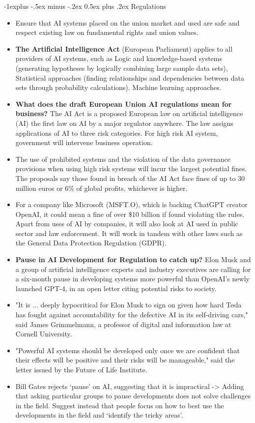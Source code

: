 \documentclass[12pt, landscape]{article}
\makeatletter
\renewcommand{\subsection}{\@startsection{subsection}{2}{0mm}%
                                {-1explus -.5ex minus -.2ex}%
                                {0.5ex plus .2ex}%
                                {\normalfont\normalsize\bfseries}}
\makeatother
\begin{document}
\begin{multicols*}{3}
\subsection{Regulations}
\begin{itemize}
\item Ensure that AI systems placed on the union market and used are safe and respect existing law on fundamental rights and union values.
\item \textbf{The Artificial Intelligence Act} (European Parliament) applies to all providers of AI systems, such as 
Logic and knowledge-based systems (generating hypotheses by logically combining large sample data sets),
Statistical approaches (finding relationships and dependencies between data sets through probability calculations).
Machine learning approaches.
\item \textbf{What does the draft European Union AI regulations mean for business?} The AI Act is a proposed European law on artificial intelligence (AI) the first law on AI by a major regulator anywhere. The law assigns applications of AI to three risk categories. For high risk AI system, government will intervene business operation.
\item The use of prohibited systems and the violation of the data governance provisions when using high risk systems will incur the largest potential fines. The proposals say those found in breach of the AI Act face fines of up to 30 million euros or 6\% of global profits, whichever is higher.
\item For a company like Microsoft (MSFT.O), which is backing ChatGPT creator OpenAI, it could mean a fine of over \$10 billion if found violating the rules. Apart from uses of AI by companies, it will also look at AI used in public sector and law enforcement. It will work in tandem with other laws such as the General Data Protection Regulation (GDPR).

\item \textbf{Pause in AI Development for Regulation to catch up?} Elon Musk and a group of artificial intelligence experts and industry executives are calling for a six-month pause in developing systems more powerful than OpenAI's newly launched GPT-4, in an open letter citing potential risks to society. 
\item "It is ... deeply hypocritical for Elon Musk to sign on given how hard Tesla has fought against accountability for the defective AI in its self-driving cars," said James Grimmelmann, a professor of digital and information law at Cornell University.
\item "Powerful AI systems should be developed only once we are confident that their effects will be positive and their risks will be manageable," said the letter issued by the Future of Life Institute.
\item Bill Gates rejects `pause' on AI, suggesting that it is impractical -> Adding that asking particular groups to pause developments does not solve challenges in the field. Suggest instead that people focus on how to best use the developments in the field and `identify the tricky areas'.
\end{itemize}




\end{multicols*}
\end{document}
